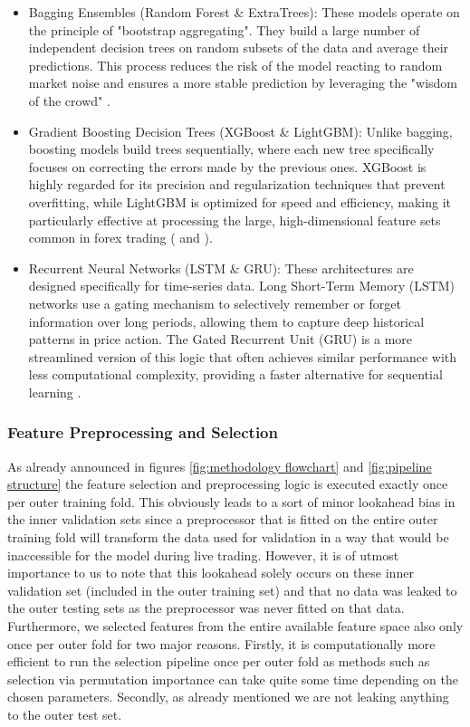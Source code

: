 \documentclass[12pt, a4paper]{article}
\begin{document}
\begin{itemize}
    \item Bagging Ensembles (Random Forest \& ExtraTrees): These models operate on the principle of "bootstrap aggregating". They build a large number of independent decision trees 
    on random subsets of the data and average their predictions. This process reduces the risk of the model reacting to random market noise and 
    ensures a more stable prediction by leveraging the "wisdom of the crowd" \parencite{scikit-learn}.

    \item Gradient Boosting Decision Trees (XGBoost \& LightGBM): Unlike bagging, boosting models build trees sequentially, where each new tree specifically focuses on 
    correcting the errors made by the previous ones. XGBoost is highly regarded for its precision and regularization techniques that prevent overfitting, 
    while LightGBM is optimized for speed and efficiency, making it particularly effective at processing the large, high-dimensional feature sets common in forex trading 
    (\parencite{Ke2017LightGBMAH} and \parencite{Chen:2016:XST:2939672.2939785}).

    \item Recurrent Neural Networks (LSTM \& GRU): These architectures are designed specifically for time-series data. Long Short-Term Memory (LSTM) networks use a gating mechanism 
    to selectively remember or forget information over long periods, allowing them to capture deep historical patterns in price action. The Gated Recurrent Unit (GRU) is a more 
    streamlined version of this logic that often achieves similar performance with less computational complexity, providing a faster alternative for sequential learning 
    \parencite{NEURIPS2019_9015}.
\end{itemize}


\subsubsection{Feature Preprocessing and Selection}\label{sec:preprocessing_scaling}

As already announced in figures \ref{fig:methodology flowchart} and \ref{fig:pipeline structure} the feature selection and preprocessing logic is executed exactly once per outer training fold.
This obviously leads to a sort of minor lookahead bias in the inner validation sets since a preprocessor that is fitted on the entire outer training fold will transform the data used for 
validation in a way that would be inaccessible for the model during live trading. However, it is of utmost importance to us to note that this lookahead solely occurs on these inner validation 
set (included in the outer training set) and that no data was leaked to the outer testing sets as the preprocessor was never fitted on that data. Furthermore, we selected features from the 
entire available feature space also only once per outer fold for two major reasons. Firstly, it is computationally more efficient to run the selection pipeline once per outer fold as methods 
such as selection via permutation importance can take quite some time depending on the chosen parameters. Secondly, as already mentioned we are not leaking anything to the outer test set.
\end{document}
